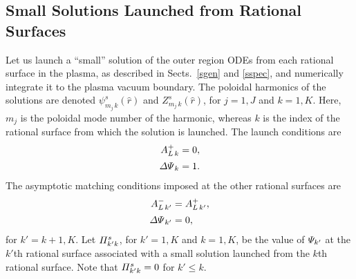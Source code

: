 \documentclass[12pt,prb,aps]{revtex4-1}
\begin{document}
\subsection{Small Solutions Launched from Rational Surfaces}
Let us launch a ``small'' solution of the outer region ODEs  from each rational surface in the plasma, as described in Sects.~\ref{sgen} and \ref{sspec}, 
 and numerically integrate it to the plasma vacuum boundary. The poloidal harmonics of
the solutions are denoted $\psi^s_{m_{j}\,k}(\hat{r})$ and $Z^s_{m_{j}\,k}(\hat{r})$, for $j=1,J$ and $k=1,K$. Here,
$m_{j}$ is the poloidal mode number of the harmonic, whereas $k$ is the index of the rational surface from which the solution is launched.
The launch conditions are
\begin{align}
A_{L\,k}^+ &=  0,\\[0.5ex]
{\mit\Delta\Psi}_k &=1.
\end{align}
The asymptotic matching conditions imposed at the other rational surfaces are
\begin{align}
A_{L\,k'}^{-} &= A_{L\,k'}^+,\\[0.5ex]
{\mit\Delta\Psi}_{k'} &= 0,
\end{align}
for $k'=k+1,K$.
Let 
${\mit\Pi}_{k'k}^s$, for $k'=1,K$ and $k=1,K$,  be the value of ${\mit\Psi}_{k'}$ at the $k'$th rational surface associated with a small solution
launched from the $k$th rational surface. Note that ${\mit\Pi}_{k'k}^s=0$ for $k' \leq k$.  
\end{document}
